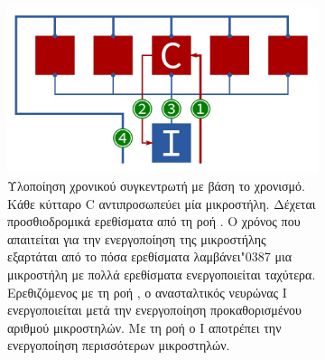 	\begin{figure}[t]
		\centering
		\hfill
		\begin{subfigure}[t]{0.4\textwidth}
			\centering
			\includegraphics[width=\textwidth]{figures/spatial_hardware}
			\caption[κυκλωματική υλοποίηση χωρικού συγκεντρωτή]{Υλοποίηση χρονικού συγκεντρωτή με βάση το χρονισμό.
			Κάθε κύτταρο C αντιπροσωπεύει μία μικροστήλη. Δέχεται προσθιοδρομικά ερεθίσματα από τη ροή .
			Ο χρόνος που απαιτείται για την ενεργοποίηση της μικροστήλης εξαρτάται από το πόσα ερεθίσματα λαμβάνει\char"0387 μια μικροστήλη με πολλά ερεθίσματα ενεργοποιείται ταχύτερα.
			Ερεθιζόμενος με τη ροή , ο ανασταλτικός νευρώνας I ενεργοποιείται μετά την ενεργοποίηση προκαθορισμένου αριθμού μικροστηλών.
			Με τη ροή  ο I αποτρέπει την ενεργοποίηση περισσότερων μικροστηλών.
			}
			\label{fig:SP_circ}
		\end{subfigure}
		\hfill
		\begin{subfigure}[t]{0.35\textwidth}
			\centering

\end{subfigure}
\end{figure}
